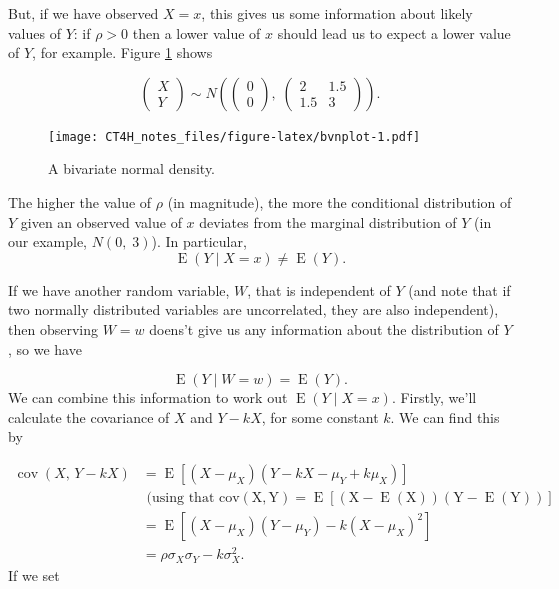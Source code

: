 \documentclass[
  openany]{book}
\theoremstyle{definition}
\theoremstyle{definition}
\theoremstyle{definition}
\theoremstyle{definition}
\theoremstyle{remark}
\begin{document}
But, if we have observed \(X=x\), this gives us some information about likely values of \(Y\): if \(\rho>0\) then a lower value of \(x\) should lead us to expect a lower value of \(Y\), for example. Figure \ref{fig:bvnplot} shows

\begin{equation}
\begin{pmatrix}
X\\
Y
\end{pmatrix} \sim N\left(
\begin{pmatrix}
0\\
0
\end{pmatrix},\;
\begin{pmatrix}
2 & 1.5 \\
1.5 & 3
\end{pmatrix}
\right).
\label{eq:bvneg}
\end{equation}

\begin{figure}
\centering
\texttt{[image: CT4H\_notes\_files/figure-latex/bvnplot-1.pdf]}
\caption{\label{fig:bvnplot}A bivariate normal density.}
\end{figure}

The higher the value of \(\rho\) (in magnitude), the more the conditional distribution of \(Y\) given an observed value of \(x\) deviates from the marginal distribution of \(Y\) (in our example, \(N\left(0,\;3\right)\)). In particular, \[\operatorname{E}\left(Y\mid{X=x}\right)\neq{\operatorname{E}\left(Y\right)}.\]

If we have another random variable, \(W\), that is independent of \(Y\) (and note that if two normally distributed variables are uncorrelated, they are also independent), then observing \(W=w\) doens't give us any information about the distribution of \(Y\), so we have

\[ \operatorname{E}\left(Y\mid{W=w}\right)={\operatorname{E}\left(Y\right)}. \]
We can combine this information to work out \(\operatorname{E}\left(Y\mid{X=x}\right)\). Firstly, we'll calculate the covariance of \(X\) and \(Y-kX\), for some constant \(k\). We can find this by

\[
\begin{aligned}
\operatorname{cov}\left(X,\,Y-kX\right) &= \operatorname{E}\left[\left(X-\mu_X\right)\left(Y-kX - \mu_Y + k\mu_X\right)\right]\\
&\text{ (using that }\operatorname{cov\left(X,Y\right)=\operatorname{E}\left[\left(X-\operatorname{E}\left(X\right)\right)\left(Y-\operatorname{E}\left(Y\right)\right)\right]}\\
& = \operatorname{E}\left[\left(X-\mu_X\right)\left(Y-\mu_Y\right) - k\left(X-\mu_X\right)^2\right]\\
& = \rho \sigma_X\sigma_Y - k\sigma_X^2.
\end{aligned}
\]
If we set
\end{document}
